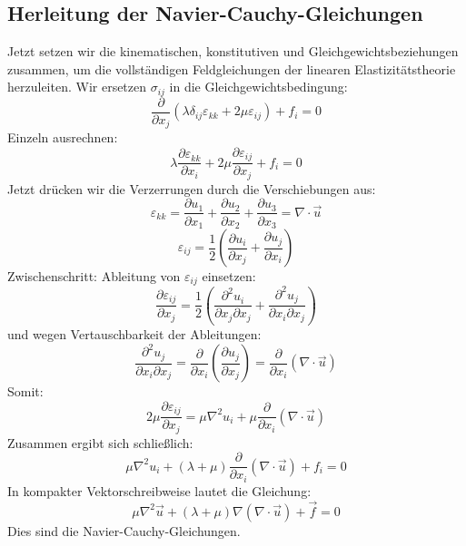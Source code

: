 \subsection{Herleitung der Navier-Cauchy-Gleichungen}
Jetzt setzen wir die kinematischen, konstitutiven und Gleichgewichtsbeziehungen zusammen, um die vollständigen Feldgleichungen der linearen Elastizitätstheorie herzuleiten.
Wir ersetzen $\sigma_{ij}$ in die Gleichgewichtsbedingung:
	\begin{equation}
		\frac{\partial}{\partial x_j}\left( \lambda \delta_{ij} \varepsilon_{kk} + 2\mu \varepsilon_{ij} \right) + f_i = 
		0
	\end{equation}
Einzeln ausrechnen:
	\begin{equation}
		\lambda \frac{\partial \varepsilon_{kk}}{\partial x_i} + 2\mu \frac{\partial \varepsilon_{ij}}{\partial x_j} + f_i = 
		0
	\end{equation}
Jetzt drücken wir die Verzerrungen durch die Verschiebungen aus:
	\begin{equation}
		\varepsilon_{kk} = 
		\frac{\partial u_1}{\partial x_1} + \frac{\partial u_2}{\partial x_2} + \frac{\partial u_3}{\partial x_3} = 
		\nabla \cdot \vec{u}
	\end{equation}
	\begin{equation}
		\varepsilon_{ij} = 
		\frac{1}{2}\left( \frac{\partial u_i}{\partial x_j} + \frac{\partial 	u_j}{\partial x_i} \right)
	\end{equation}
Zwischenschritt: Ableitung von $\varepsilon_{ij}$ einsetzen:
	\begin{equation}
		\frac{\partial \varepsilon_{ij}}{\partial x_j} = 
		\frac{1}{2}\left( \frac{\partial^2 u_i}{\partial x_j \partial x_j} + \frac{\partial^2 u_j}{\partial x_i \partial x_j} \right)
	\end{equation}
und wegen Vertauschbarkeit der Ableitungen:
	\begin{equation}
		\frac{\partial^2 u_j}{\partial x_i \partial x_j} = 
		\frac{\partial}{\partial x_i}\left( \frac{\partial u_j}{\partial x_j} \right) = 	\frac{\partial}{\partial x_i}(\nabla \cdot \vec{u})
	\end{equation}
Somit:
	\begin{equation}
		2\mu \frac{\partial \varepsilon_{ij}}{\partial x_j} = 
		\mu \nabla^2 u_i + \mu 	\frac{\partial}{\partial x_i}(\nabla \cdot \vec{u})
	\end{equation}
Zusammen ergibt sich schließlich:
	\begin{equation}
		\mu \nabla^2 u_i + (\lambda+\mu) \frac{\partial}{\partial x_i}(\nabla \cdot \vec{u}) + f_i = 
		0
	\end{equation}
In kompakter Vektorschreibweise lautet die Gleichung:
	\begin{equation}
		\mu \nabla^2 \vec{u} + (\lambda+\mu) \nabla (\nabla \cdot \vec{u}) + \vec{f} = 
		0
	\end{equation}
Dies sind die Navier-Cauchy-Gleichungen.
	
